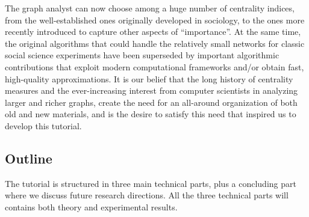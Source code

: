 \documentclass{sig-alternate}
\begin{document}
The graph analyst can now choose among a huge number of centrality indices, from
the well-established ones originally developed in sociology, to the ones more
recently introduced to capture other aspects of ``importance''.  At the same
time, the original algorithms that could handle the relatively small networks
for classic social science experiments have been superseded by important
algorithmic contributions that exploit modern computational frameworks and/or
obtain fast, high-quality approximations. It is our belief that the long history of
centrality measures and the ever-increasing interest from computer
scientists in analyzing larger and richer graphs, create the need for an
all-around organization of both old and new materials, and is the desire to
satisfy this need that inspired us to develop this tutorial.

\subsection*{Outline}
The tutorial is structured in three main technical parts, plus a concluding part
where we discuss future research directions. All the three technical parts will
contains both theory and experimental results.
\end{document}
